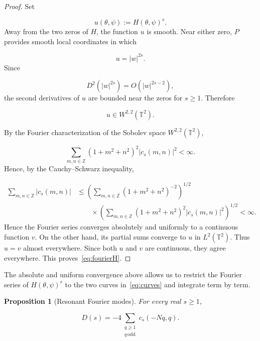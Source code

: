 \documentclass[11pt]{article}
\theoremstyle{plain}
\newtheorem{proposition}[theorem]{Proposition}
\theoremstyle{definition}
\theoremstyle{remark}
\begin{document}
\begin{proof}
Set

\[
  u(\theta ,\psi ) := H(\theta ,\psi )^s .
\]
Away from the two zeros of $H$, the function $u$ is smooth. Near either zero, $P$ provides smooth local coordinates in which

\[
  u = |w|^{2s} .
\]
Since

\[
  D^{2}(|w|^{2s}) = O(|w|^{2s-2}) ,
\]
the second derivatives of $u$ are bounded near the zeros for $s \ge 1$. Therefore

\[
  u \in W^{2,2}(\mathbb{T}^{2}) .
\]

By the Fourier characterization of the Sobolev space $W^{2,2}(\mathbb{T}^{2})$,

\[
  \sum_{m,n \in \mathbb{Z}} (1 + m^{2} + n^{2})^{2} |c_s(m,n)|^{2} < \infty .
\]
Hence, by the Cauchy--Schwarz inequality,

\begin{align*}
  \sum_{m,n \in \mathbb{Z}} |c_s(m,n)| &\le \left( \sum_{m,n \in \mathbb{Z}} (1 + m^{2} + n^{2})^{-2} \right)^{1/2} \\
  &\qquad \times \left( \sum_{m,n \in \mathbb{Z}} (1 + m^{2} + n^{2})^{2} |c_s(m,n)|^{2} \right)^{1/2} < \infty .
\end{align*}
Hence the Fourier series converges absolutely and uniformly to a continuous function $v$. On the other hand, its partial sums converge to $u$ in $L^{2}(\mathbb{T}^{2})$. Thus $u = v$ almost everywhere. Since both $u$ and $v$ are continuous, they agree everywhere. This proves~\eqref{eq:fourierH}.
\end{proof}

The absolute and uniform convergence above allows us to restrict the Fourier series of $H(\theta ,\psi )^s$ to the two curves in~\eqref{eq:curves} and integrate term by term.

\begin{proposition}[Resonant Fourier modes]\label{res:2.3}
For every real $s \ge 1$,

\begin{equation}\label{eq:resonant}
  D(s) = -4 \sum_{\substack{q \ge 1 \\ q \,\mathrm{odd}}} c_s(-Nq, q) .
\end{equation}
\end{proposition}
\end{document}
